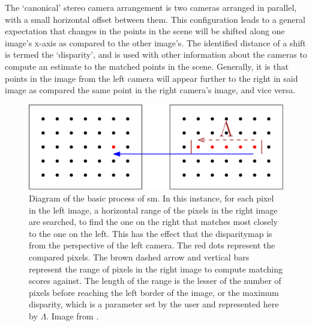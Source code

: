 The `canonical' stereo camera arrangement is two cameras arranged in parallel, with a small horizontal offset between them.  This configuration leads to a general expectation that changes in the points in the scene will be shifted along one image's x-axis as compared to the other image's.  The identified distance of a shift is termed the `\gls{disparity}', and is used with other information about the cameras to compute an estimate to the matched points in the scene.  Generally, it is  that points in the image from the left camera will appear further to the right in said image as compared the same point in the right camera's image, and vice versa.

\begin{figure}
    \centering
    \includegraphics[width=1.0\textwidth]{chapters/litreview/images/stereo_matching-eps-converted-to.pdf}
    \caption[Diagram of the basic process of \gls{sm}]{Diagram of the basic process of \gls{sm}. In this instance, for each pixel in the left image, a horizontal range of the pixels in the right image are searched, to find the one on the right that matches most closely to the one on the left. This has the effect that the \gls{disparitymap} is from the perspective of the left camera. The red dots represent the compared pixels. The brown dashed arrow and vertical bars represent the range of pixels in the right image to compute matching scores against. The length of the range is the lesser of the number of pixels before reaching the left border of the image, or the maximum \gls{disparity}, which is a parameter set by the user and represented here by \(\Lambda\).  Image from \cite{bsmpcvpic}.}
    \label{fig:stereomatchingbasic}
\end{figure}


